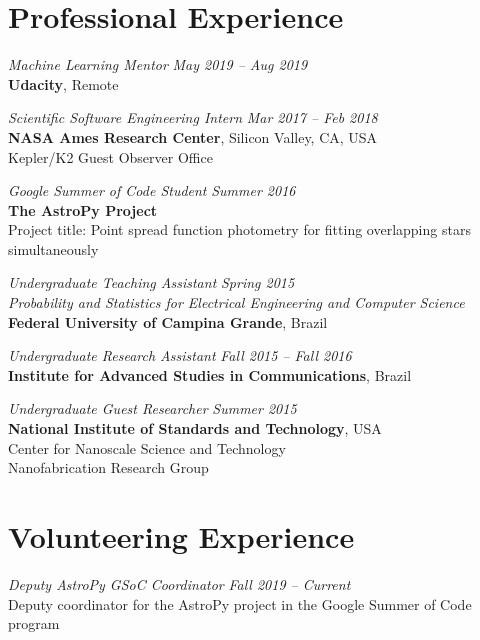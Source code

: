 \documentclass[10pt]{article}
\begin{document}
\begin{titlepage}
\section*{Professional Experience}
\emph{Machine Learning Mentor} \hfill \textit{May 2019  -- Aug 2019}
\\\textbf{Udacity}, Remote
\vspace{.5cm}

\emph{Scientific Software Engineering Intern} \hfill \textit{Mar 2017 -- Feb 2018}
\\\textbf{NASA Ames Research Center}, Silicon Valley, CA, USA
\\Kepler/K2 Guest Observer Office
\vspace{.5cm}

\emph{Google Summer of Code Student} \hfill \textit{Summer 2016}
\\\textbf{The AstroPy Project}
\\ Project title: Point spread function photometry for fitting overlapping stars simultaneously
\vspace{.5cm}

\emph{Undergraduate Teaching Assistant} \hfill \textit{Spring 2015}
\\\emph{Probability and Statistics for Electrical Engineering and Computer Science}
\\\textbf{Federal University of Campina Grande}, Brazil
\vspace{.5cm}

\emph{Undergraduate Research Assistant} \hfill \textit{Fall 2015 -- Fall 2016}
\\\textbf{Institute for Advanced Studies in Communications}, Brazil
\vspace{.5cm}

\emph{Undergraduate Guest Researcher} \hfill \textit{Summer 2015}
\\\textbf{National Institute of Standards and Technology}, USA
\\Center for Nanoscale Science and Technology
\\Nanofabrication Research Group
\vspace{.5cm}


\section*{Volunteering Experience}
\emph{Deputy AstroPy GSoC Coordinator} \hfill \textit{Fall 2019 -- Current}
\\Deputy coordinator for the AstroPy project in the Google Summer of Code program
\vspace{.5cm}


\end{titlepage}
\end{document}

